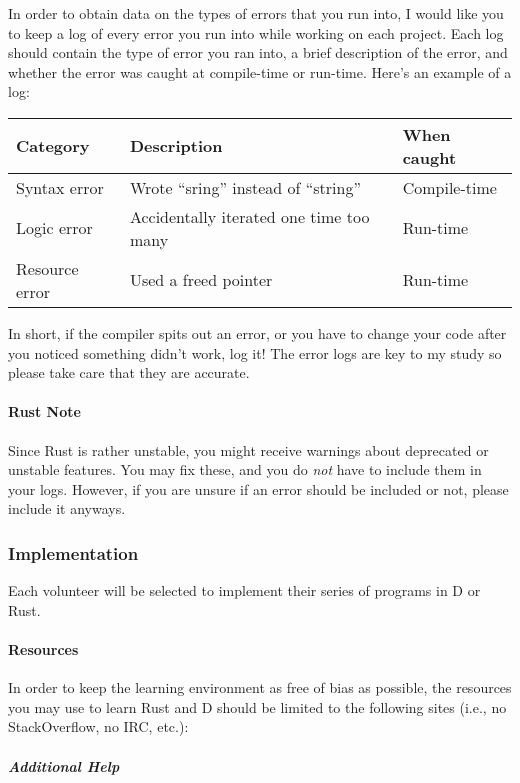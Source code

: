 In order to obtain data on the types of errors that you run into, I
would like you to keep a log of every error you run into while working
on each project. Each log should contain the type of error you ran into,
a brief description of the error, and whether the error was caught at
compile-time or run-time. Here's an example of a log:

\begin{longtable}[c]{@{}lll@{}}
\toprule
Category & Description & When caught\tabularnewline
\midrule
\endhead
Syntax error & Wrote ``sring'' instead of ``string'' &
Compile-time\tabularnewline
Logic error & Accidentally iterated one time too many &
Run-time\tabularnewline
Resource error & Used a freed pointer & Run-time\tabularnewline
\bottomrule
\end{longtable}

In short, if the compiler spits out an error, or you have to change your
code after you noticed something didn't work, log it! The error logs are
key to my study so please take care that they are accurate.

\paragraph{Rust Note}\label{rust-note}

Since Rust is rather unstable, you might receive warnings about
deprecated or unstable features. You may fix these, and you do
\emph{not} have to include them in your logs. However, if you are unsure
if an error should be included or not, please include it anyways.

\subsubsection{Implementation}\label{implementation}

Each volunteer will be selected to implement their series of programs in
D or Rust.

\paragraph{Resources}\label{resources}

In order to keep the learning environment as free of bias as possible,
the resources you may use to learn Rust and D should be limited to the
following sites (i.e., no StackOverflow, no IRC, etc.):

\subparagraph{Additional Help}\label{additional-help}

